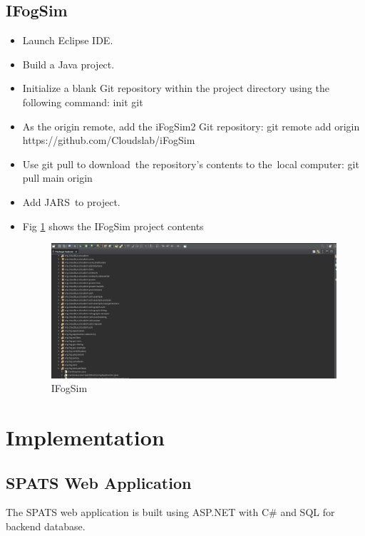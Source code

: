 \documentclass[10pt]{article}
\begin{document}
\subsection{IFogSim}
\begin{itemize}
    \item Launch Eclipse IDE.
\item Build a Java project.
\item Initialize a blank Git repository within the project directory using the following command:
\newline
init git
\item As the origin remote, add the iFogSim2 Git repository:
\newline git remote add origin https://github.com/Cloudslab/iFogSim \cite{6}
\item Use git pull to download the repository's contents to the local computer:
\newline git pull main origin
\item Add JARS to project.
\item Fig \ref{fig:ifog} shows the IFogSim project contents
\begin{figure}[H]
    \begin{center}
        \includegraphics[width=0.7\linewidth, frame]{CA2-template/CM8.png}
       \caption{IFogSim \label{fig:ifog}}
    \end{center}
\end{figure}
\end{itemize}

\section{Implementation}

\subsection{SPATS Web Application}
The SPATS web application is built using ASP.NET with C# and SQL for backend database.
\end{document}
